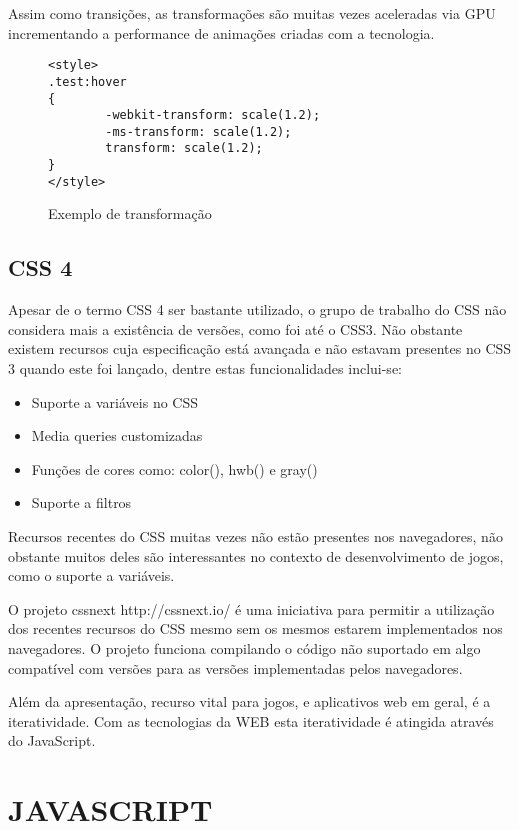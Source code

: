 Assim como transições, as transformações são muitas vezes aceleradas
via GPU incrementando a performance de animações criadas com a tecnologia.

\begin{figure}[H]
\centering
\begin{verbatim}
<style>
.test:hover
{
        -webkit-transform: scale(1.2);
        -ms-transform: scale(1.2);
        transform: scale(1.2);
}
</style>
\end{verbatim}
\caption{Exemplo de transformação}
\label{fig:CSSTransform}
\end{figure}

\subsection{CSS 4}

Apesar de o termo CSS 4 ser bastante utilizado, o grupo de trabalho do CSS
não considera mais a existência de versões, como foi até o CSS3.
Não obstante existem recursos cuja especificação está avançada e não estavam presentes
no CSS 3 quando este foi lançado, dentre estas funcionalidades inclui-se:

\begin{itemize}
\item Suporte a variáveis no CSS
\item Media queries customizadas
\item Funções de cores como: color(), hwb() e gray()
\item Suporte a filtros
\end{itemize}

Recursos recentes do CSS muitas vezes não estão presentes nos
navegadores, não obstante muitos deles são interessantes no contexto
de desenvolvimento de jogos, como o suporte a variáveis.

O projeto cssnext http://cssnext.io/ é uma iniciativa para permitir a
utilização dos recentes recursos do CSS mesmo sem os mesmos estarem
implementados nos navegadores. O projeto funciona compilando o código
não suportado em algo compatível com versões para as versões
implementadas pelos navegadores.

Além da apresentação, recurso vital para jogos, e aplicativos web em
geral, é a iteratividade. Com as tecnologias da WEB esta iteratividade
é atingida através do JavaScript.
\section{JAVASCRIPT}

